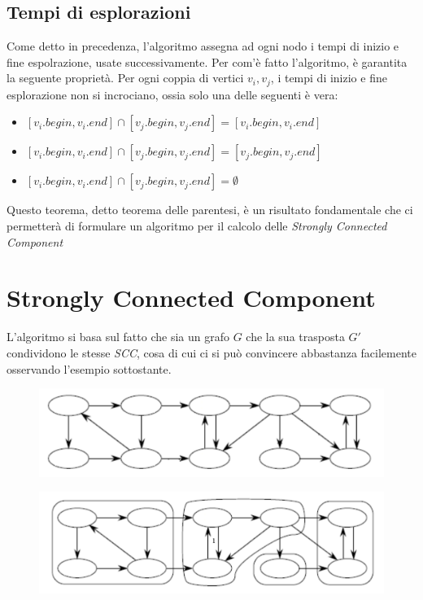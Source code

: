 \documentclass{article}
\begin{document}
\subsection{Tempi di esplorazioni}
Come detto in precedenza, l'algoritmo assegna ad ogni nodo i tempi di inizio e fine espolrazione, usate successivamente. Per com'è fatto l'algoritmo, è garantita la seguente proprietà. \newline
Per ogni coppia di vertici $v_i, v_j$, i tempi di inizio e fine esplorazione non si incrociano, ossia solo una delle seguenti è vera:
\begin{itemize}
	\item $[v_i.begin, v_i.end] \cap [v_j.begin, v_j.end] = [v_i.begin, v_i.end]$
	\item $[v_i.begin, v_i.end] \cap [v_j.begin, v_j.end] = [v_j.begin, v_j.end]$
	\item $[v_i.begin, v_i.end] \cap [v_j.begin, v_j.end] = \emptyset$
\end{itemize}
Questo teorema, detto teorema delle parentesi, è un risultato fondamentale che ci permetterà di formulare un algoritmo per il calcolo delle \textit{Strongly Connected Component}

\newpage
\section{Strongly Connected Component}

L'algoritmo si basa sul fatto che sia un grafo $G$ che la sua trasposta $G'$ condividono le stesse \emph{SCC}, cosa di cui ci si può convincere abbastanza facilemente osservando l'esempio sottostante.

\begin{figure}[h]
	\centering
	\includegraphics[width=1\linewidth]
	{"./graph1.png"}
	\label{graph}
\end{figure}

\begin{figure}[h]
\centering
\includegraphics[width=1\linewidth]
{"./graph2.png"}
\label{graph}
\end{figure}
\end{document}
